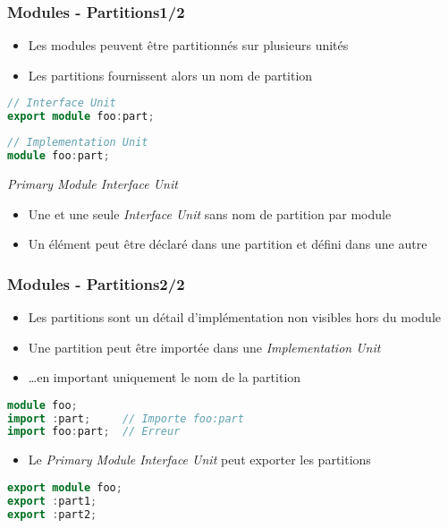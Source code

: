 \documentclass[C++.tex]{subfiles}
\begin{document}
\begin{frame}[fragile]
	\frametitle{Modules - Partitions\titlehfill{}1/2}
	\begin{itemize}
		\item Les modules peuvent être partitionnés sur plusieurs unités
		\item Les partitions fournissent alors un nom de partition
	\end{itemize}

	\begin{lstlisting}[language=C++]
// Interface Unit
export module foo:part;\end{lstlisting}

	\begin{lstlisting}[language=C++]
// Implementation Unit
module foo:part;\end{lstlisting}

	\begin{alertblock}{\textit{Primary Module Interface Unit}}
		\begin{itemize}
			\item Une et une seule \textit{Interface Unit} sans nom de partition par module
		\end{itemize}
	\end{alertblock}

	\begin{itemize}
		\item Un élément peut être déclaré dans une partition et défini dans une autre
	\end{itemize}
\end{frame}

\begin{frame}[fragile]
	\frametitle{Modules - Partitions\titlehfill{}2/2}
	\begin{itemize}
		\item Les partitions sont un détail d'implémentation non visibles hors du module


		\item Une partition peut être importée dans une \textit{Implementation Unit}
		\item \ldots{}en important uniquement le nom de la partition
	\end{itemize}

	\begin{lstlisting}[language=C++]
module foo;
import :part;     // Importe foo:part
import foo:part;  // Erreur\end{lstlisting}

	\begin{itemize}
		\item Le \textit{Primary Module Interface Unit} peut exporter les partitions
	\end{itemize}

	\begin{lstlisting}[language=C++]
export module foo;
export :part1;
export :part2;\end{lstlisting}
\end{frame}
\end{document}

